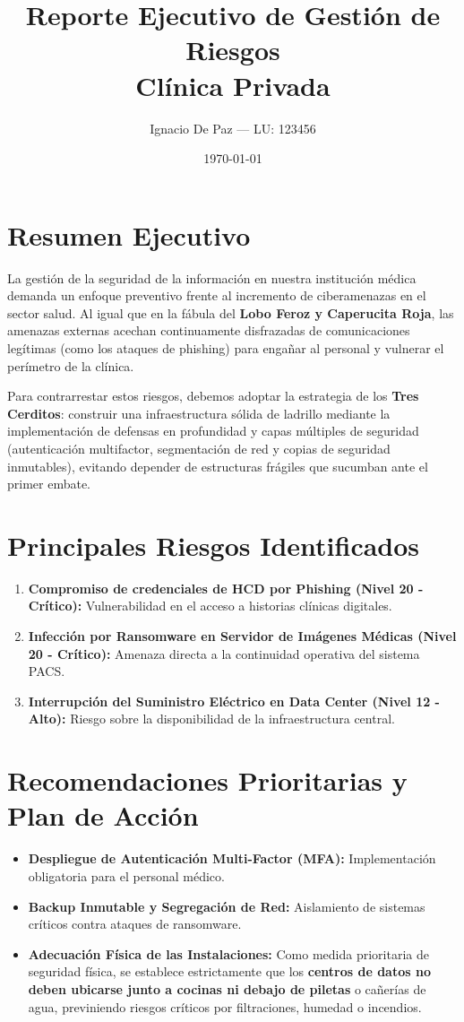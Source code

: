 \documentclass[11pt,a4paper]{article}
\title{\textbf{Reporte Ejecutivo de Gestión de Riesgos}\\ \large Clínica Privada}
\author{Ignacio De Paz --- LU: 123456}
\date{\today}
\begin{document}
\maketitle

\section{Resumen Ejecutivo}
La gestión de la seguridad de la información en nuestra institución médica demanda un enfoque preventivo frente al incremento de ciberamenazas en el sector salud. Al igual que en la fábula del \textbf{Lobo Feroz y Caperucita Roja}, las amenazas externas acechan continuamente disfrazadas de comunicaciones legítimas (como los ataques de phishing) para engañar al personal y vulnerar el perímetro de la clínica.

Para contrarrestar estos riesgos, debemos adoptar la estrategia de los \textbf{Tres Cerditos}: construir una infraestructura sólida de ladrillo mediante la implementación de defensas en profundidad y capas múltiples de seguridad (autenticación multifactor, segmentación de red y copias de seguridad inmutables), evitando depender de estructuras frágiles que sucumban ante el primer embate.

\section{Principales Riesgos Identificados}
\begin{enumerate}
    \item \textbf{Compromiso de credenciales de HCD por Phishing (Nivel 20 - Crítico):} Vulnerabilidad en el acceso a historias clínicas digitales.
    \item \textbf{Infección por Ransomware en Servidor de Imágenes Médicas (Nivel 20 - Crítico):} Amenaza directa a la continuidad operativa del sistema PACS.
    \item \textbf{Interrupción del Suministro Eléctrico en Data Center (Nivel 12 - Alto):} Riesgo sobre la disponibilidad de la infraestructura central.
\end{enumerate}

\section{Recomendaciones Prioritarias y Plan de Acción}
\begin{itemize}
    \item \textbf{Despliegue de Autenticación Multi-Factor (MFA):} Implementación obligatoria para el personal médico.
    \item \textbf{Backup Inmutable y Segregación de Red:} Aislamiento de sistemas críticos contra ataques de ransomware.
    \item \textbf{Adecuación Física de las Instalaciones:} Como medida prioritaria de seguridad física, se establece estrictamente que los \textbf{centros de datos no deben ubicarse junto a cocinas ni debajo de piletas} o cañerías de agua, previniendo riesgos críticos por filtraciones, humedad o incendios.
\end{itemize}
\end{document}
